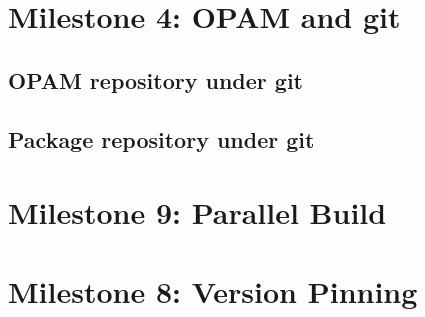 \documentclass[a4paper,11pt]{article}
\begin{document}
\section{Milestone 4: OPAM and git}

\subsection{OPAM repository under git}

\subsection{Package repository under git}


\section{Milestone 9: Parallel Build}

\section{Milestone 8: Version Pinning}
\end{document}
